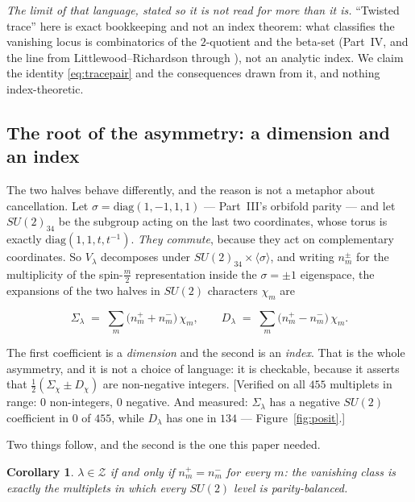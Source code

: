 \documentclass[11pt,a4paper]{article}
\newtheorem{corollary}{Corollary}
\newcommand{\Sig}{\Sigma_\lambda}
\newcommand{\Dl}{D_\lambda}
\newenvironment{keyeq}
  {\begin{center}\setlength{\fboxsep}{9pt}\setlength{\fboxrule}{0.8pt}%
   \begin{lrbox}{\keyeqbox}\begin{minipage}{0.88\textwidth}}
  {\end{minipage}\end{lrbox}%
   \fcolorbox{hdrblue!55}{hdrblue!6}{\usebox{\keyeqbox}}\end{center}}
\begin{document}
\emph{The limit of that language, stated so it is not read for more than it is.} ``Twisted trace''
here is exact bookkeeping and not an index theorem: what classifies the vanishing locus is
combinatorics of the $2$-quotient and the beta-set (Part~IV, and the line from Littlewood--Richardson
through \cite{Lecouvey,AK,Albion}), not an analytic index. We claim the identity \eqref{eq:tracepair}
and the consequences drawn from it, and nothing index-theoretic.

\subsection*{The root of the asymmetry: a dimension and an index}

The two halves behave differently, and the reason is not a metaphor about cancellation. Let
$\sigma=\mathrm{diag}(1,-1,1,1)$ --- Part~III's orbifold parity --- and let $SU(2)_{34}$ be the
subgroup acting on the last two coordinates, whose torus is exactly
$\mathrm{diag}(1,1,t,t^{-1})$. \emph{They commute}, because they act on complementary coordinates. So
$V_\lambda$ decomposes under $SU(2)_{34}\times\langle\sigma\rangle$, and writing $n^\pm_m$ for the
multiplicity of the spin-$\tfrac m2$ representation inside the $\sigma=\pm1$ eigenspace, the
expansions of the two halves in $SU(2)$ characters $\chi_m$ are

\begin{keyeq}
\begin{equation}\label{eq:dimindex}
\Sig \;=\; \sum_m \big(n^+_m+n^-_m\big)\,\chi_m ,
\qquad
\Dl \;=\; \sum_m \big(n^+_m-n^-_m\big)\,\chi_m .
\end{equation}
\end{keyeq}

\noindent The first coefficient is a \emph{dimension} and the second is an \emph{index}. That is the
whole asymmetry, and it is not a choice of language: it is checkable, because it asserts that
$\tfrac12(\Sigma_\chi\pm D_\chi)$ are non-negative integers. [Verified on all $455$ multiplets in
range: $0$ non-integers, $0$ negative. And measured: $\Sig$ has a negative $SU(2)$ coefficient in
$0$ of $455$, while $\Dl$ has one in $134$ --- Figure~\ref{fig:posit}.]

Two things follow, and the second is the one this paper needed.

\begin{corollary}\label{cor:balance}
$\lambda\in\mathcal Z$ if and only if $n^+_m=n^-_m$ for \emph{every} $m$: the vanishing class is
exactly the multiplets in which every $SU(2)$ level is parity-balanced.
\end{corollary}
\end{document}
